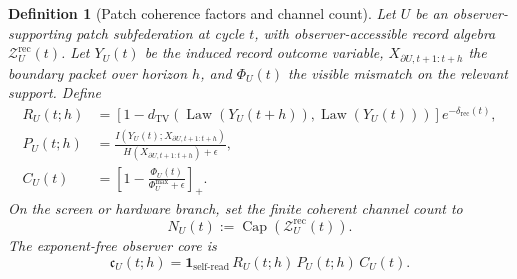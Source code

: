 \documentclass[11pt]{article}
\numberwithin{equation}{section}
\newtheorem{definition}[theorem]{Definition}
\theoremstyle{remark}
\newcommand{\Zrec}{\mathcal Z^{\mathrm{rec}}}
\newcommand{\RecCap}{\operatorname{Cap}}
\newcommand{\Law}{\operatorname{Law}}
\newcommand{\TV}{\mathrm{TV}}
\begin{document}
\begin{definition}[Patch coherence factors and channel count]
Let \(U\) be an observer-supporting patch subfederation at cycle \(t\), with
observer-accessible record algebra \(\Zrec_U(t)\). Let \(Y_U(t)\) be the induced
record outcome variable, \(X_{\partial U,t+1:t+h}\) the boundary packet
over horizon \(h\), and \(\Phi_U(t)\) the visible mismatch on the relevant
support. Define
\begin{align}
R_U(t;h)
&=
\left[
1-
d_{\TV}\!\left(
\Law(Y_U(t+h)),\Law(Y_U(t))
\right)
\right]e^{-\delta_{\mathrm{rec}}(t)},
\label{eq:R-factor}\\
P_U(t;h)
&=
\frac{
I\!\left(Y_U(t);X_{\partial U,t+1:t+h}\right)
}{
H\!\left(X_{\partial U,t+1:t+h}\right)+\epsilon
},
\label{eq:P-factor}\\
C_U(t)
&=
\left[
1-\frac{\Phi_U(t)}{\Phi_U^{\max}+\epsilon}
\right]_+.
\label{eq:C-factor}
\end{align}
On the screen or hardware branch, set the finite coherent channel count to
\begin{equation}
N_U(t):=\RecCap(\Zrec_U(t)).
\label{eq:channel-count}
\end{equation}
The exponent-free observer core is
\begin{equation}
\mathfrak c_U(t;h)=
\mathbf 1_{\mathrm{self\mbox{-}read}}\,
R_U(t;h)\,
P_U(t;h)\,
C_U(t).
\label{eq:canonical-core}
\end{equation}
\end{definition}
\end{document}
